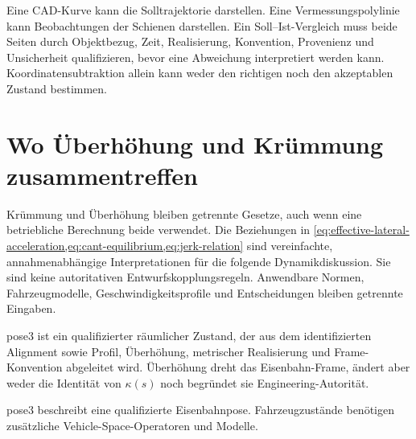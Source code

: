 Eine CAD-Kurve kann die Solltrajektorie darstellen. Eine
Vermessungspolylinie kann Beobachtungen der Schienen darstellen. Ein
Soll--Ist-Vergleich muss beide Seiten durch Objektbezug, Zeit, Realisierung,
Konvention, Provenienz und Unsicherheit qualifizieren, bevor eine Abweichung
interpretiert werden kann. Koordinatensubtraktion allein kann weder den
richtigen noch den akzeptablen Zustand bestimmen.

\section{Wo Überhöhung und Krümmung zusammentreffen}

Krümmung und Überhöhung bleiben getrennte Gesetze, auch wenn eine betriebliche
Berechnung beide verwendet. Die Beziehungen in
\cref{eq:effective-lateral-acceleration,eq:cant-equilibrium,eq:jerk-relation}
sind vereinfachte, annahmenabhängige Interpretationen für die folgende
Dynamikdiskussion. Sie sind keine autoritativen Entwurfskopplungsregeln.
Anwendbare Normen, Fahrzeugmodelle, Geschwindigkeitsprofile und Entscheidungen
bleiben getrennte Eingaben.

\begin{summary}
pose3 ist ein qualifizierter räumlicher Zustand, der aus dem identifizierten
Alignment sowie Profil, Überhöhung, metrischer Realisierung und
Frame-Konvention abgeleitet wird. Überhöhung dreht das Eisenbahn-Frame, ändert
aber weder die Identität von \(\kappa(s)\) noch begründet sie
Engineering-Autorität.
\end{summary}

\begin{proposition}[Gleiszustandsprinzip]
pose3 beschreibt eine qualifizierte Eisenbahnpose. Fahrzeugzustände benötigen
zusätzliche Vehicle-Space-Operatoren und Modelle.
\end{proposition}
